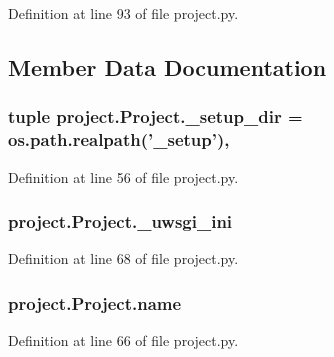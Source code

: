 Definition at line 93 of file project.\-py.



\subsection{Member Data Documentation}
\hypertarget{classproject_1_1Project_a86ab95986a7c432991e1d5a3f7618401}{
\subsubsection[{\-\_\-setup\-\_\-dir}]{\setlength{\rightskip}{0pt plus 5cm}tuple project.\-Project.\-\_\-setup\-\_\-dir = os.\-path.\-realpath('\-\_\-setup')\hspace{0.3cm}{\ttfamily [static]}, {\ttfamily [private]}}}\label{classproject_1_1Project_a86ab95986a7c432991e1d5a3f7618401}


Definition at line 56 of file project.\-py.

\hypertarget{classproject_1_1Project_ae80c6958d6c84acb2d35f8dcafc7e445}{
\subsubsection[{\-\_\-uwsgi\-\_\-ini}]{\setlength{\rightskip}{0pt plus 5cm}project.\-Project.\-\_\-uwsgi\-\_\-ini\hspace{0.3cm}{\ttfamily [private]}}}\label{classproject_1_1Project_ae80c6958d6c84acb2d35f8dcafc7e445}


Definition at line 68 of file project.\-py.

\hypertarget{classproject_1_1Project_a575c22bbfaf434da1d68f33ffa90572a}{
\subsubsection[{name}]{\setlength{\rightskip}{0pt plus 5cm}project.\-Project.\-name}}\label{classproject_1_1Project_a575c22bbfaf434da1d68f33ffa90572a}


Definition at line 66 of file project.\-py.


